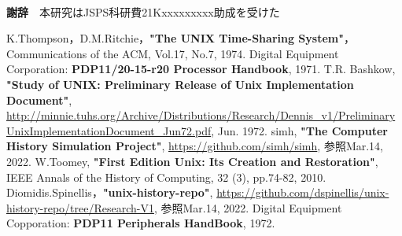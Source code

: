 \newpage
~\\
\noindent\textbf{謝辞}~~本研究はJSPS科研費21Kxxxxxxxxx助成を受けた
\begin{thebibliography}{99}
\small
\setlength\itemsep{-0.5\zh}%
 K.Thompson，D.M.Ritchie，\textbf{"The UNIX Time-Sharing System"}，Communications of the ACM, Vol.17, No.7, 1974.
 Digital Equipment Corporation: \textbf{PDP11/20-15-r20 Processor Handbook}, 1971.
 T.R. Bashkow, \textbf{"Study of UNIX: Preliminary Release of Unix Implementation Document"}, \url{ http://minnie.tuhs.org/Archive/Distributions/Research/Dennis_v1/PreliminaryUnixImplementationDocument_Jun72.pdf}, Jun. 1972.
 simh, \textbf{"The Computer History Simulation Project"}, \url{https://github.com/simh/simh}, 参照Mar.14, 2022.
 W.Toomey, \textbf{"First Edition Unix: Its Creation and Restoration"}, IEEE Annals of the History of Computing, 32 (3), pp.74-82, 2010.
 Diomidis.Spinellis，\textbf{"unix-history-repo"},  \url{https://github.com/dspinellis/unix-history-repo/tree/Research-V1}, 参照Mar.14, 2022.
 Digital Equipment Copporation: \textbf{PDP11 Peripherals HandBook}, 1972.
\end{thebibliography}

 
